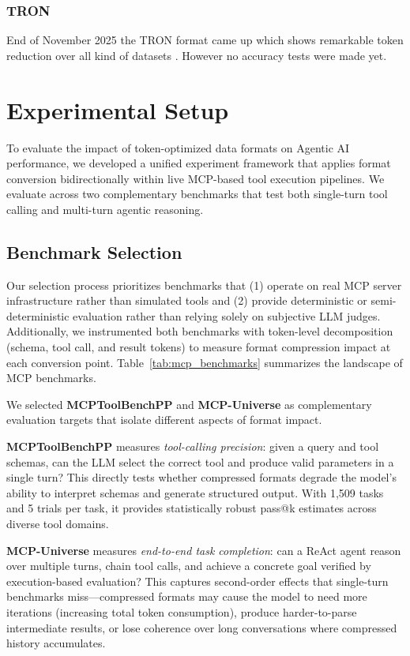\documentclass[10pt,twocolumn,letterpaper]{article}
\begin{document}
\citep{toon-format/toon_2026}
\subsubsection{TRON}
End of November 2025 the TRON format came up which shows remarkable token reduction over all kind of datasets \citep{tron-format/tron-javascript_2026}. However no accuracy tests were made yet.

\section{Experimental Setup}
\label{sec:experimental_setup}

To evaluate the impact of token-optimized data formats on Agentic AI performance, we developed a unified experiment framework that applies format conversion bidirectionally within live MCP-based tool execution pipelines. We evaluate across two complementary benchmarks that test both single-turn tool calling and multi-turn agentic reasoning.

\subsection{Benchmark Selection}
\label{sec:benchmark_selection}

Our selection process prioritizes benchmarks that (1) operate on real MCP server infrastructure rather than simulated tools and (2) provide deterministic or semi-deterministic evaluation rather than relying solely on subjective LLM judges. Additionally, we instrumented both benchmarks with token-level decomposition (schema, tool call, and result tokens) to measure format compression impact at each conversion point. Table~\ref{tab:mcp_benchmarks} summarizes the landscape of MCP benchmarks.

We selected \textbf{MCPToolBenchPP} and \textbf{MCP-Universe} as complementary evaluation targets that isolate different aspects of format impact.

\textbf{MCPToolBenchPP} measures \textit{tool-calling precision}: given a query and tool schemas, can the LLM select the correct tool and produce valid parameters in a single turn? This directly tests whether compressed formats degrade the model's ability to interpret schemas and generate structured output. With 1,509 tasks and 5 trials per task, it provides statistically robust pass@k estimates across diverse tool domains.

\textbf{MCP-Universe} measures \textit{end-to-end task completion}: can a ReAct agent reason over multiple turns, chain tool calls, and achieve a concrete goal verified by execution-based evaluation? This captures second-order effects that single-turn benchmarks miss---compressed formats may cause the model to need more iterations (increasing total token consumption), produce harder-to-parse intermediate results, or lose coherence over long conversations where compressed history accumulates.
\end{document}
